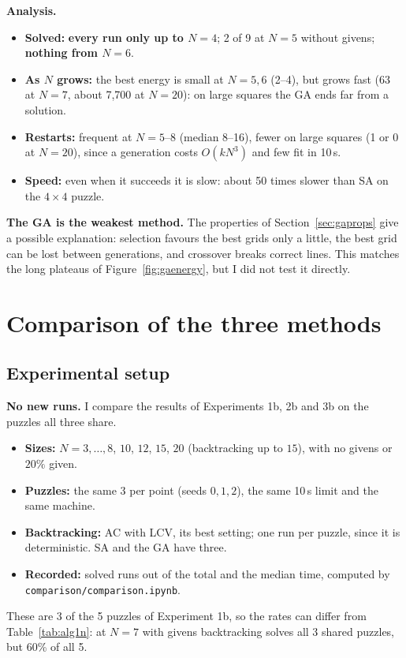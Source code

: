 \documentclass[11pt,a4paper]{article}
\begin{document}
\textbf{Analysis.}
\begin{itemize}[nosep]
  \item \textbf{Solved:} \textbf{every run only up to $N=4$}; 2 of 9 at $N=5$
        without givens; \textbf{nothing from $N=6$}.
  \item \textbf{As $N$ grows:} the best energy is small at $N=5,6$ (2--4),
        but grows fast (63 at $N=7$, about 7{,}700 at $N=20$): on large
        squares the GA ends far from a solution.
  \item \textbf{Restarts:} frequent at $N=5$--$8$ (median 8--16), fewer on
        large squares (1 or 0 at $N=20$), since a generation costs
        $O(kN^3)$ and few fit in 10\,s.
  \item \textbf{Speed:} even when it succeeds it is slow: about 50 times
        slower than SA on the $4\times4$ puzzle.
\end{itemize}
\textbf{The GA is the weakest method.} The properties of
Section~\ref{sec:gaprops} give a possible explanation: selection
favours the best grids only a little, the best grid can be lost between
generations, and crossover breaks correct lines. This matches the long
plateaus of Figure~\ref{fig:gaenergy}, but I did not test it directly.

\section{Comparison of the three methods}
\label{sec:compare}

\subsection{Experimental setup}

\textbf{No new runs.} I compare the results of Experiments 1b, 2b and 3b
on the puzzles all three share.
\begin{itemize}[nosep]
  \item \textbf{Sizes:} $N=3,\dots,8$, $10$, $12$, $15$, $20$ (backtracking
        up to $15$), with no givens or $20\%$ given.
  \item \textbf{Puzzles:} the same 3 per point (seeds $0,1,2$), the same
        10\,s limit and the same machine.
  \item \textbf{Backtracking:} AC with LCV, its best setting; one run per
        puzzle, since it is deterministic. SA and the GA have three.
  \item \textbf{Recorded:} solved runs out of the total and the median time,
        computed by \nolinkurl{comparison/comparison.ipynb}.
\end{itemize}
These are 3 of the 5 puzzles of Experiment 1b, so the rates can differ
from Table~\ref{tab:alg1n}: at $N=7$ with givens backtracking solves all
3 shared puzzles, but 60\% of all 5.
\end{document}
